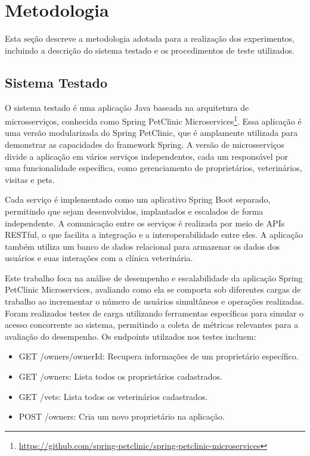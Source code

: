 \documentclass[conference]{IEEEtran}
\begin{document}
    \section{Metodologia}

    Esta seção descreve a metodologia adotada para a realização dos experimentos,
    incluindo a descrição do sistema testado e os procedimentos de teste
    utilizados.

    \subsection{Sistema Testado}

    O sistema testado é uma aplicação Java baseada na arquitetura de microsserviços,
    conhecida como Spring PetClinic Microservices\footnote{\url{https://github.com/spring-petclinic/spring-petclinic-microservices}}.
    Essa aplicação é uma versão modularizada do Spring PetClinic, que é amplamente
    utilizada para demonstrar as capacidades do framework Spring. A versão de
    microsserviços divide a aplicação em vários serviços independentes, cada um responsável
    por uma funcionalidade específica, como gerenciamento de proprietários, veterinários,
    visitas e pets.

    Cada serviço é implementado como um aplicativo Spring Boot separado, permitindo
    que sejam desenvolvidos, implantados e escalados de forma independente. A comunicação
    entre os serviços é realizada por meio de APIs RESTful, o que facilita a
    integração e a interoperabilidade entre eles. A aplicação também utiliza um banco
    de dados relacional para armazenar os dados dos usuários e suas interações com
    a clínica veterinária.

    Este trabalho foca na análise de desempenho e escalabilidade da aplicação Spring
    PetClinic Microservices, avaliando como ela se comporta sob diferentes
    cargas de trabalho ao incrementar o número de usuários simultâneos e
    operações realizadas. Foram realizados testes de carga utilizando ferramentas
    específicas para simular o acesso concorrente ao sistema, permitindo a
    coleta de métricas relevantes para a avaliação do desempenho. Os endpoints utilzados
    nos testes incluem:

    \begin{itemize}
        \item GET /owners/{ownerId}: Recupera informações de um proprietário específico.

        \item GET /owners: Lista todos os proprietários cadastrados.

        \item GET /vets: Lista todos os veterinários cadastrados.

        \item POST /owners: Cria um novo proprietário na aplicação.
    \end{itemize}
\end{document}
